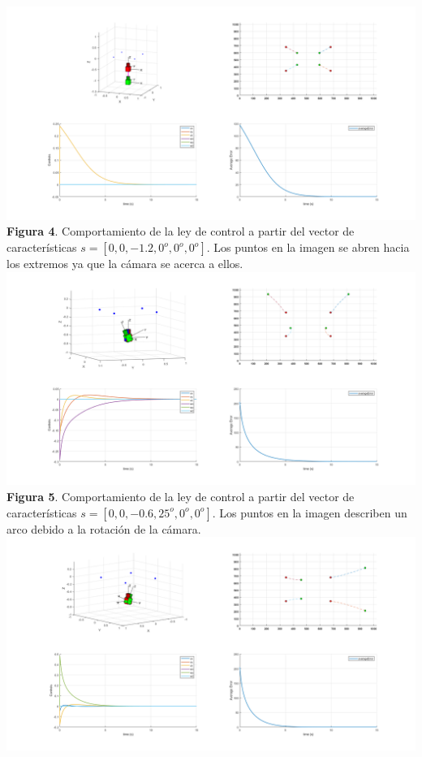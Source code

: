 \documentclass{article}
\begin{document}
\begin{center}
	\includegraphics[scale=0.3]{extra_3.png}\\
	{\footnotesize \textbf{Figura 4}. Comportamiento de la ley de control a partir del vector de caracter\'isticas $s=[0,0,-1.2,0^o,0^o,0^o]$. Los puntos en la imagen se abren hacia los extremos ya que la c\'amara se acerca a ellos.}\\
	\includegraphics[scale=0.3]{extra_4.png}\\
	{\footnotesize \textbf{Figura 5}. Comportamiento de la ley de control a partir del vector de caracter\'isticas $s=[0,0,-0.6,25^o,0^o,0^o]$. Los puntos en la imagen describen un arco debido a la rotaci\'on de la c\'amara.}\\
	\includegraphics[scale=0.3]{extra_5.png}\\

\end{center}
\end{document}

